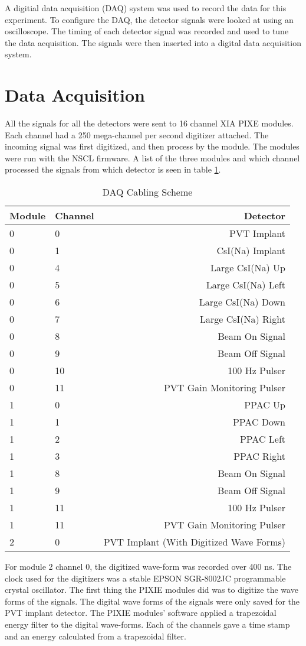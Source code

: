 \documentclass[main.tex]{subfiles}
\begin{document}
A digitial data acquisition (DAQ) system was used to record the data for this experiment.
To configure the DAQ, the detector signals were looked at using an oscilloscope.
The timing of each detector signal was recorded and used to tune the data acquisition. 
The signals were then inserted into a digital data acquisition system.

\section{Data Acquisition}

All the signals for all the detectors were sent to 16 channel XIA PIXE modules. 
Each channel had a 250 mega-channel per second digitizer attached.
The incoming signal was first digitized, and then process by the module. 
The modules were run with the NSCL firmware.
A list of the three modules and which channel processed the signals from which detector is seen in table \ref{tab:cablingscheme}.
%
\begin{table}[!hbt]
	\centering
	\caption{DAQ Cabling Scheme}
		\begin{tabular}{llr}
		Module & Channel & Detector \\ \hline
		0 & 0 & PVT Implant \\
		0 & 1 & CsI(Na) Implant \\
		0 & 4 & Large CsI(Na) Up \\
		0 & 5 & Large CsI(Na) Left \\
		0 & 6 & Large CsI(Na) Down \\
		0 & 7 & Large CsI(Na) Right \\
		0 & 8 & Beam On Signal \\
		0 & 9 & Beam Off Signal \\
		0 & 10 & 100 Hz Pulser \\
		0 & 11 & PVT Gain Monitoring Pulser \\
		1 & 0 & PPAC Up \\ 
		1 & 1 & PPAC Down \\ 
		1 & 2 & PPAC Left \\ 
		1 & 3 & PPAC Right \\ 
		1 & 8 & Beam On Signal\\
		1 & 9 & Beam Off Signal\\
		1 & 11 & 100 Hz Pulser \\
		1 & 11 & PVT Gain Monitoring Pulser \\
		2 & 0 & PVT Implant (With Digitized Wave Forms)
		\end{tabular}	
		\label{tab:cablingscheme}
\end{table}
%
For module 2 channel 0, the digitized wave-form was recorded over 400 ns.
The clock used for the digitizers was a stable EPSON SGR-8002JC programmable crystal oscillator.
The first thing the PIXIE modules did was to digitize the wave forms of the signals.
The digital wave forms of the signals were only saved for the PVT implant detector.
The PIXIE modules' software applied a trapezoidal energy filter to the digital wave-forms.
Each of the channels gave a time stamp and an energy calculated from a trapezoidal filter.
\end{document}
